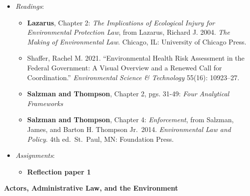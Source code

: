 \begin{itemize}

\item
  \emph{Readings}:

  \begin{itemize}
  
  \item
    \textbf{Lazarus}, Chapter 2: \emph{The Implications of Ecological
    Injury for Environmental Protection Law}, from Lazarus, Richard J.
    2004. \emph{The Making of Environmental Law}. Chicago, IL:
    University of Chicago Press.
  \item
    Shaffer, Rachel M. 2021. ``Environmental Health Risk Assessment in
    the Federal Government: A Visual Overview and a Renewed Call for
    Coordination.'' \emph{Environmental Science \& Technology} 55(16):
    10923--27.
  \item
    \textbf{Salzman and Thompson}, Chapter 2, pgs. 31-49: \emph{Four
    Analytical Frameworks}
  \item
    \textbf{Salzman and Thompson}, Chapter 4: \emph{Enforcement}, from
    Salzman, James, and Barton H. Thompson Jr.~2014. \emph{Environmental
    Law and Policy}. 4th ed.~St.~Paul, MN: Foundation Press.
  \end{itemize}
\item
  \emph{Assignments}:

  \begin{itemize}
  
  \item
    \textbf{Reflection paper 1}
  \end{itemize}
\end{itemize}

\week \textbf{Actors, Administrative Law, and the Environment}

